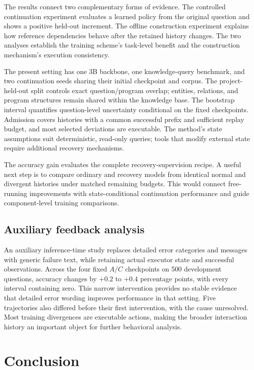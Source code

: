 The results connect two complementary forms of evidence. The controlled continuation experiment evaluates a learned policy from the original question and shows a positive held-out increment. The offline construction experiment explains how reference dependencies behave after the retained history changes. The two analyses establish the training scheme's task-level benefit and the construction mechanism's execution consistency.

The present setting has one 3B backbone, one knowledge-query benchmark, and two continuation seeds sharing their initial checkpoint and corpus. The project-held-out split controls exact question/program overlap; entities, relations, and program structures remain shared within the knowledge base. The bootstrap interval quantifies question-level uncertainty conditional on the fixed checkpoints. Admission covers histories with a common successful prefix and sufficient replay budget, and most selected deviations are executable. The method's state assumptions suit deterministic, read-only queries; tools that modify external state require additional recovery mechanisms.

The accuracy gain evaluates the complete recovery-supervision recipe. A useful next step is to compare ordinary and recovery models from identical normal and divergent histories under matched remaining budgets. This would connect free-running improvements with state-conditional continuation performance and guide component-level training comparisons.

\subsection{Auxiliary feedback analysis}

An auxiliary inference-time study replaces detailed error categories and messages with generic failure text, while retaining actual executor state and successful observations. Across the four fixed $A/C$ checkpoints on 500 development questions, accuracy changes by $+0.2$ to $+0.4$ percentage points, with every interval containing zero. This narrow intervention provides no stable evidence that detailed error wording improves performance in that setting. Five trajectories also differed before their first intervention, with the cause unresolved. Most training divergences are executable actions, making the broader interaction history an important object for further behavioral analysis.

\section{Conclusion}

